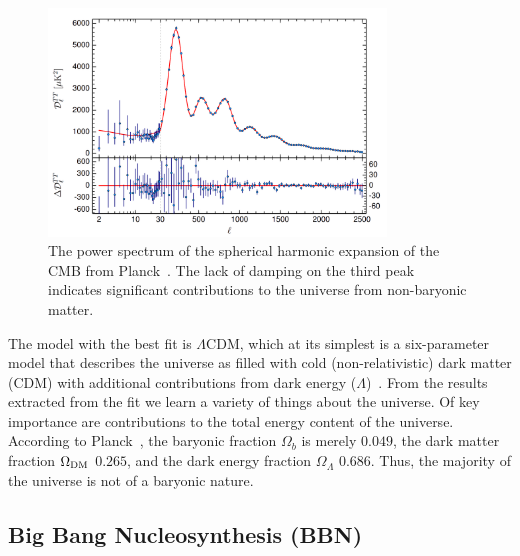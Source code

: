\begin{figure}[htb]
\centering
    \includegraphics[width=0.8\textwidth]{figures/dm/planck2015_cmb}
    \caption{The power spectrum of the spherical harmonic expansion of the CMB from Planck~\cite{Ade:2015xua}. The lack of damping on the third peak indicates significant contributions to the universe from non-baryonic matter.}\label{fig:cmb_ps}
\end{figure}

The model with the best fit is $\Lambda$CDM, which at its simplest is a six-parameter model that describes the universe as filled with cold (non-relativistic) dark matter (CDM) with additional contributions from dark energy ($\Lambda$)~\cite{Riess:1998cb}. From the results extracted from the fit we learn a variety of things about the universe. Of key importance are contributions to the total energy content of the universe. According to Planck~\cite{Ade:2015xua}, the baryonic fraction $\Omega_b$ is merely $0.049$, the dark matter fraction $\Omega_{\mathrm{DM}}$ $0.265$, and the dark energy fraction $\Omega_{\Lambda}$ $0.686$. Thus, the majority of the universe is not of a baryonic nature.

\subsection{Big Bang Nucleosynthesis (BBN)}


